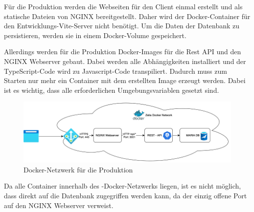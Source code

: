 
Für die Produktion werden die Webseiten für den Client einmal erstellt und als statische Dateien von NGINX bereitgestellt. 
Daher wird der Docker-Container für den Entwicklungs-Vite-Server nicht benötigt. 
Um die Daten der Datenbank zu persistieren, werden sie in einem Docker-Volume gespeichert. 

Allerdings werden für die Produktion Docker-Images für die Rest API und den NGINX Webserver gebaut. Dabei werden alle Abhängigkeiten installiert und der TypeScript-Code wird zu Javascript-Code transpiliert. Dadurch muss zum Starten nur mehr ein Container mit dem erstellten Image erzeugt werden. 
Dabei ist es wichtig, dass alle erforderlichen Umgebungsvariablen gesetzt sind.

\begin{figure}[H]
    \centering
    \includegraphics{media/Docker/ProdNetwork.png}
    \caption{Docker-Netzwerk für die Produktion}
\end{figure}

Da alle Container innerhalb des \ZELIA-Docker-Netzwerks liegen, ist es nicht möglich, dass direkt auf die Datenbank zugegriffen werden kann, da der einzig offene Port auf den NGINX Webserver verweist. 

